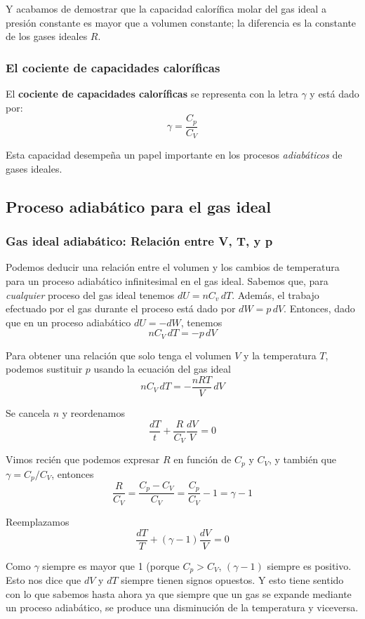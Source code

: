 \documentclass[12pt]{article}
\begin{document}
  Y acabamos de demostrar que la capacidad calorífica molar del gas ideal a presión constante es mayor que a volumen constante; la diferencia es la constante de los gases ideales $ R $.

  \subsubsection{El cociente de capacidades caloríficas}
  El \textbf{cociente de capacidades caloríficas} se representa con la letra $ \gamma $ y está dado por:
  \[
  \gamma = \frac{C_{p}}{C_{V}}
  \]

  Esta capacidad desempeña un papel importante en los procesos \textit{adiabáticos} de gases ideales.

  \subsection{Proceso adiabático para el gas ideal}
  \subsubsection{Gas ideal adiabático: Relación entre V, T, y p}
  Podemos deducir una relación entre el volumen y los cambios de temperatura para un proceso adiabático infinitesimal en el gas ideal. Sabemos que, para \textit{cualquier} proceso del gas ideal tenemos $ dU = nC_{v}\,dT $. Además, el trabajo efectuado por el gas durante el proceso está dado por $ dW = p\,dV $. Entonces, dado que en un proceso adiabático $ dU = -dW $, tenemos
  \[
  nC_{V}\,dT = -p\,dV
  \]

  Para obtener una relación que solo tenga el volumen $ V $ y la temperatura $ T $, podemos sustituir $ p $ usando la ecuación del gas ideal
  \[
  nC_{V}\,dT = -\frac{nRT}{V}\,dV 
  \]
  
  Se cancela $ n $ y reordenamos
  \[
  \frac{dT}{t} + \frac{R}{C_{V}}\frac{dV}{V} = 0
  \]

  Vimos recién que podemos expresar $ R $ en función de $ C_{p} $ y $ C_{V} $, y también que $ \gamma = C_{p}/C_{V} $, entonces
  \[
    \frac{R}{C_{V}} = \frac{C_{p}-C_{V}}{C_{V}} = \frac{C_{p}}{C_{V}} - 1 = \gamma - 1
  \]

  Reemplazamos
  \[
  \frac{dT}{T} + (\gamma - 1) \frac{dV}{V} = 0
  \]

  Como $ \gamma $ siempre es mayor que 1 (porque $ C_{p} > C_{V} $, $ (\gamma - 1) $ siempre es positivo. Esto nos dice que $ dV $ y $ dT $ siempre tienen signos opuestos. Y esto tiene sentido con lo que sabemos hasta ahora ya que siempre que un gas se expande mediante un proceso adiabático, se produce una disminución de la temperatura y viceversa.
\end{document}
